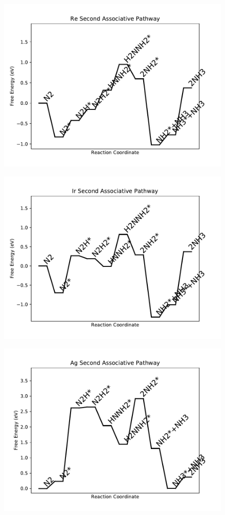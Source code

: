 \begin{figure}
\centering
\includegraphics[width=0.8\linewidth]{data/plots/Re_associative_2.pdf}
\end{figure}

\begin{figure}
\centering
\includegraphics[width=0.8\linewidth]{data/plots/Ir_associative_2.pdf}
\end{figure}

\begin{figure}
\centering
\includegraphics[width=0.8\linewidth]{data/plots/Ag_associative_2.pdf}
\end{figure}

